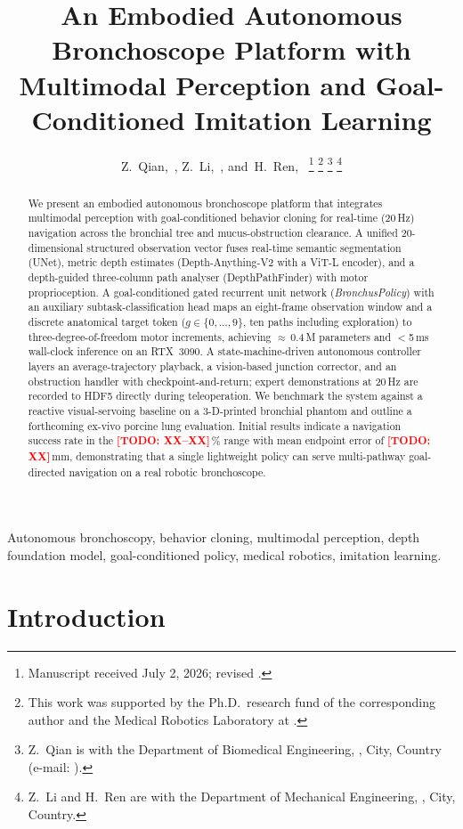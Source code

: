 \documentclass[journal,comsoc]{IEEEtran}
\title{An Embodied Autonomous Bronchoscope Platform with\\
Multimodal Perception and Goal-Conditioned Imitation Learning}
\author{%
  Z.~Qian,~\IEEEmembership{Graduate~Student~Member,~IEEE},
  Z.~Li,~\IEEEmembership{Member,~IEEE},
  and~H.~Ren,~\IEEEmembership{Senior~Member,~IEEE}%
  \thanks{Manuscript received July 2, 2026; revised \TODO{XX\,\,XX, 2026}.}%
  \thanks{This work was supported by the Ph.D.\ research fund of the
          corresponding author and the Medical Robotics Laboratory
          at \TODO{Affiliation~1}.}
  \thanks{Z.~Qian is with the Department of Biomedical Engineering,
          \TODO{Affiliation~1}, City, Country (e-mail: \TODO{author@email}).}%
  \thanks{Z.~Li and H.~Ren are with the Department of Mechanical
          Engineering, \TODO{Affiliation~1}, City, Country.}}
\newcommand{\TODO}[1]{\textcolor{red}{\textbf{[TODO: #1]}}}
\newcommand{\goal}{g}
\begin{document}
\maketitle

\begin{abstract}
We present an embodied autonomous bronchoscope platform that integrates
multimodal perception with goal-conditioned behavior cloning for
real-time (20\,Hz) navigation across the bronchial tree and
mucus-obstruction clearance. A unified 20-dimensional structured
observation vector fuses real-time semantic segmentation (UNet),
metric depth estimates (Depth-Anything-V2 with a ViT-L encoder), and
a depth-guided three-column path analyser (DepthPathFinder) with
motor proprioception. A goal-conditioned gated recurrent unit network
(\textit{BronchusPolicy}) with an auxiliary subtask-classification
head maps an eight-frame observation window and a discrete anatomical
target token ($\goal\!\in\!\{0,\dots,9\}$, ten paths including
exploration) to three-degree-of-freedom motor increments, achieving
$\approx$\,0.4\,M parameters and $<$5\,ms wall-clock inference on an
RTX~3090. A state-machine-driven autonomous controller layers an
average-trajectory playback, a vision-based junction corrector, and an
obstruction handler with checkpoint-and-return; expert demonstrations
at 20\,Hz are recorded to HDF5 directly during teleoperation.
We benchmark the system against a reactive visual-servoing baseline
on a 3-D-printed bronchial phantom and outline a forthcoming
ex-vivo porcine lung evaluation. Initial results indicate a
navigation success rate in the \TODO{XX--XX}\,\% range with mean
endpoint error of \TODO{XX}\,mm, demonstrating that a single
lightweight policy can serve multi-pathway goal-directed navigation
on a real robotic bronchoscope.
\end{abstract}

\begin{IEEEkeywords}
Autonomous bronchoscopy, behavior cloning, multimodal perception,
depth foundation model, goal-conditioned policy, medical robotics,
imitation learning.
\end{IEEEkeywords}

\section{Introduction}
\label{sec:intro}
\end{document}
